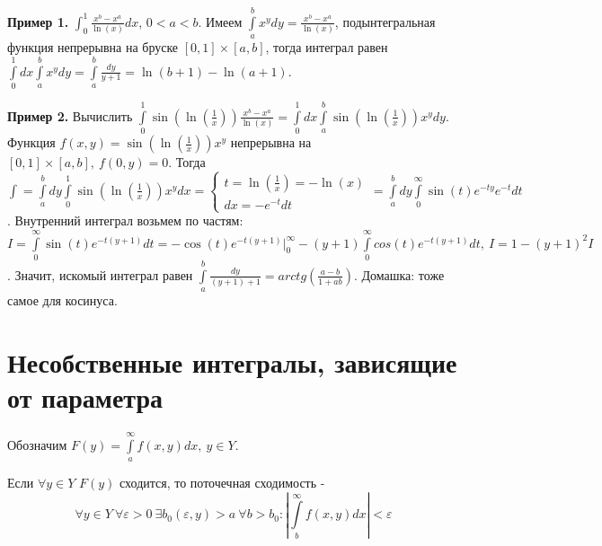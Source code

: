 \textbf{Пример 1.} $\int_{0}^{1} \frac{x^b-x^a}{\ln(x)}dx$, $0<a<b$.  
Имеем $\int\limits_{a}^{b} x^ydy=\frac{x^b-x^a}{\ln(x)}$, 
подынтегральная функция непрерывна на бруске $[0,1]\times[a,b]$, 
тогда интеграл равен $\int\limits_{0}^{1}dx\int\limits_{a}^{b}x^ydy=
\int\limits_{a}^{b}\frac{dy}{y+1}=\ln(b+1)-\ln(a+1)$.

\textbf{Пример 2.} Вычислить $\int\limits_{0}^{1}\sin(\ln(\frac{1}{x}))
\frac{x^b-x^a}{\ln(x)}=\int\limits_{0}^{1}dx \int\limits_{a}^{b}
\sin(\ln(\frac{1}{x}))x^ydy$. Функция $f(x,y)=\sin(\ln(\frac{1}{x}))x^y$ 
непрерывна на $[0,1]\times[a,b],~f(0,y)=0$. Тогда
$\int=\int\limits_{a}^{b}dy \int\limits_{0}^{1}\sin(\ln(\frac{1}{x}))x^ydx=
\begin{cases} t=\ln(\frac{1}{x})=-\ln(x)\\dx=-e^{-t}dt\end{cases}= 
\int\limits_{a}^{b} dy \int\limits_{0}^{\infty} \sin(t)e^{-ty}e^{-t}dt$. 
Внутренний интеграл возьмем по частям: $I=\int\limits_{0}^{\infty}
\sin(t)e^{-t(y+1)}dt=-\cos(t)e^{-t(y+1)}\big|_0^\infty
-(y+1)\int\limits_{0}^{\infty}cos(t)e^{-t(y+1)}dt,~I=1-(y+1)^2I$.
Значит, искомый интеграл равен 
$\int\limits_{a}^{b}\frac{dy}{(y+1)+1}=arctg\left( \frac{a-b}{1+ab}\right)$.
Домашка: тоже самое для косинуса.
\section{Несобственные интегралы, зависящие от параметра}
Обозначим $F(y)=\int\limits_{a}^{\infty}f(x,y)dx,~y\in Y$. 
\begin{defin}
Если $\forall y\in Y$ $F(y)$ сходится, то поточечная сходимость - 
$$\forall y\in Y~\forall \varepsilon>0~\exists b_0(\varepsilon,y)>a~
\forall b>b_0:\left| \int\limits_{b}^{\infty}f(x,y)dx\right|<\varepsilon$$
\end{defin}

